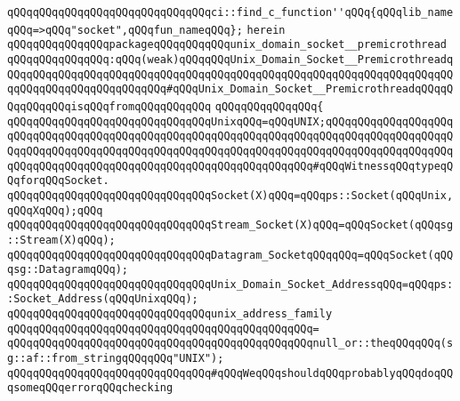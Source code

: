 \verb|qQQqqQQqqQQqqQQqqQQqqQQqqQQqqQQqci::find_c_function''qQQq{qQQqlib_nameqQQq=>qQQq"socket",qQQqfun_nameqQQq};|\newline
\verb|herein|\newline
\newline
\verb|qQQqqQQqqQQqqQQqpackageqQQqqQQqqQQqunix_domain_socket__premicrothread|\newline
\verb|qQQqqQQqqQQqqQQq:qQQq(weak)qQQqqQQqUnix_Domain_Socket__PremicrothreadqQQqqQQqqQQqqQQqqQQqqQQqqQQqqQQqqQQqqQQqqQQqqQQqqQQqqQQqqQQqqQQqqQQqqQQqqQQqqQQqqQQqqQQqqQQqqQQq#qQQqUnix_Domain_Socket__PremicrothreadqQQqqQQqqQQqqQQqisqQQqfromqQQqqQQqqQQq|\newline
\verb|qQQqqQQqqQQqqQQq{|\newline
\verb|qQQqqQQqqQQqqQQqqQQqqQQqqQQqqQQqUnixqQQq=qQQqUNIX;qQQqqQQqqQQqqQQqqQQqqQQqqQQqqQQqqQQqqQQqqQQqqQQqqQQqqQQqqQQqqQQqqQQqqQQqqQQqqQQqqQQqqQQqqQQqqQQqqQQqqQQqqQQqqQQqqQQqqQQqqQQqqQQqqQQqqQQqqQQqqQQqqQQqqQQqqQQqqQQqqQQqqQQqqQQqqQQqqQQqqQQqqQQqqQQqqQQqqQQqqQQqqQQq#qQQqWitnessqQQqtypeqQQqforqQQqSocket.|\newline
\newline
\verb|qQQqqQQqqQQqqQQqqQQqqQQqqQQqqQQqSocket(X)qQQq=qQQqps::Socket(qQQqUnix,qQQqXqQQq);qQQq|\newline
\newline
\verb|qQQqqQQqqQQqqQQqqQQqqQQqqQQqqQQqStream_Socket(X)qQQq=qQQqSocket(qQQqsg::Stream(X)qQQq);|\newline
\verb|qQQqqQQqqQQqqQQqqQQqqQQqqQQqqQQqDatagram_SocketqQQqqQQq=qQQqSocket(qQQqsg::DatagramqQQq);|\newline
\newline
\verb|qQQqqQQqqQQqqQQqqQQqqQQqqQQqqQQqUnix_Domain_Socket_AddressqQQq=qQQqps::Socket_Address(qQQqUnixqQQq);|\newline
\newline
\verb|qQQqqQQqqQQqqQQqqQQqqQQqqQQqqQQqunix_address_family|\newline
\verb|qQQqqQQqqQQqqQQqqQQqqQQqqQQqqQQqqQQqqQQqqQQqqQQq=|\newline
\verb|qQQqqQQqqQQqqQQqqQQqqQQqqQQqqQQqqQQqqQQqqQQqqQQqnull_or::theqQQqqQQq(sg::af::from_stringqQQqqQQq"UNIX");|\newline
\newline
\verb|qQQqqQQqqQQqqQQqqQQqqQQqqQQqqQQq#qQQqWeqQQqshouldqQQqprobablyqQQqdoqQQqsomeqQQqerrorqQQqchecking|\newline

